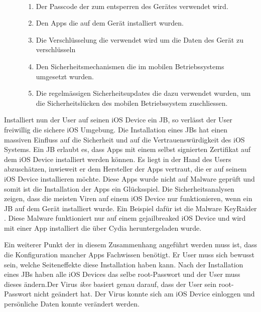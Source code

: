 \begin{description}
    \item[\parbox{\textwidth} {Die Sicherheit und Vertrauenswürdigkeit eines mobilen Gerätes hängt von mehreren Faktoren ab}]~\par
    \begin{enumerate}
        \item Der Passcode der zum entsperren des Gerätes verwendet wird.
        \item Den Apps die auf dem Gerät installiert wurden. 
        \item Die Verschlüsselung die verwendet wird um die Daten des Gerät zu verschlüsseln
        \item Den Sicherheitsmechanismen die im mobilen Betriebssystems umgesetzt wurden.
        \item Die regelmässigen Sicherheitsupdates die dazu verwendet wurden, um die Sicherheitslücken des mobilen Betriebssystem zuschliessen.  
    \end{enumerate}
\end{description} 
Installiert nun der User auf seinen iOS Device ein JB, so verlässt der User freiwillig die sichere iOS Umgebung. Die Installation eines JBs hat einen massiven Einfluss auf die Sicherheit und auf die Vertrauenswürdigkeit des iOS Systems. Ein JB erlaubt es, dass Apps mit einem selbst signierten Zertifikat auf dem iOS Device installiert werden können. Es liegt in der Hand des Users abzuschätzen, inwieweit er dem Hersteller der Apps vertraut, die er auf seinem iOS Device installieren möchte. Diese Apps wurde nicht auf Malware geprüft und somit ist die Installation der Apps ein Glücksspiel. Die Sicherheitsanalysen zeigen, dass die meisten Viren auf einem iOS Device nur funktionieren, wenn ein JB auf dem Gerät installiert wurde. Ein Beispiel dafür ist die Malware KeyRaider \cite{KeyRaider}. Diese Malware funktioniert nur auf einem gejailbreaked iOS Device und wird mit einer App installiert die über Cydia heruntergeladen wurde. \par 
 Ein weiterer Punkt der in diesem Zusammenhang angeführt werden muss ist, dass die Konfiguration mancher Apps Fachwissen benötigt.  Er User muss sich bewusst sein, welche Seiteneffekte diese Installation haben kann. Nach der Installation eines JBs haben alle iOS Devices das selbe root-Passwort und der User muss dieses ändern.Der Virus \textit{\glqq ikee\grqq{}} basiert genau darauf, dass der User sein root-Passwort nicht geändert hat. Der Virus konnte sich am iOS Device einloggen und persönliche Daten konnte verändert werden.\par 
 
